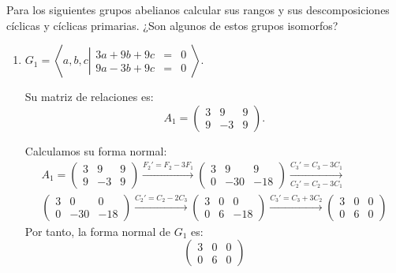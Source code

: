 \begin{ejercicio}\label{ej:7.8}
    Para los siguientes grupos abelianos calcular sus rangos y sus descomposiciones cíclicas y cíclicas primarias. ¿Son algunos de estos grupos isomorfos?
    \begin{enumerate}
        \item $G_1 = \left\langle a, b, c \left|
            \begin{array}{rcl}
                3a + 9b + 9c &=& 0 \\
                9a - 3b + 9c &=& 0
            \end{array}
        \right.\right\rangle$.


        Su matriz de relaciones es:
        \begin{equation*}
            A_1 = \begin{pmatrix}
                3 & 9 & 9 \\
                9 & -3 & 9
            \end{pmatrix}.
        \end{equation*}

        Calculamos su forma normal:
        \begin{multline*}
            A_1 = \begin{pmatrix}
                3 & 9 & 9 \\
                9 & -3 & 9
            \end{pmatrix}
            \xrightarrow{F_2' = F_2-3F_1}
            \begin{pmatrix}
                3 & 9 & 9 \\
                0 & -30 & -18
            \end{pmatrix}
            \xrightarrow[C_2' = C_2-3C_1]{C_3' = C_3-3C_1}\\
            \begin{pmatrix}
                3 & 0 & 0 \\
                0 & -30 & -18
            \end{pmatrix}
            \xrightarrow{C_2' = C_2-2C_3}
            \begin{pmatrix}
                3 & 0 & 0 \\
                0 & 6 & -18
            \end{pmatrix}
            \xrightarrow{C_3' = C_3+3C_2}
            \begin{pmatrix}
                3 & 0 & 0 \\
                0 & 6 & 0
            \end{pmatrix}
        \end{multline*}
        Por tanto, la forma normal de $G_1$ es:
        \begin{equation*}
            \begin{pmatrix}
                3 & 0 & 0 \\
                0 & 6 & 0
            \end{pmatrix}
        \end{equation*}


\end{enumerate}
\end{ejercicio}
